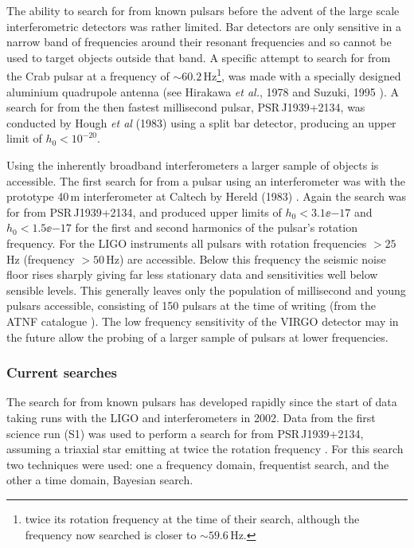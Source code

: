 The ability to search for \gws from known pulsars before the advent of the large scale
interferometric detectors was rather limited. Bar detectors are only sensitive in a narrow band of
frequencies around their resonant frequencies and so cannot be used to target objects outside
that band. A specific attempt to search for \gws from the Crab pulsar at a frequency of
$\sim 60.2$\,Hz\footnote{twice its rotation frequency at the time of their search, although the
frequency now searched is closer to $\sim 59.6$\,Hz.}, was made with a specially designed aluminium
quadrupole antenna (see Hirakawa {\it et al.}, 1978 and Suzuki, 1995 \cite{Hirakawa:1978,
Suzuki:1995}). A search for \gws from the then fastest millisecond pulsar, PSR\,J1939+2134, was
conducted by Hough {\it et al} (1983) \cite{Hough:1983} using a split bar detector, producing an
upper limit of $h_0 < 10^{-20}$. 

Using the inherently broadband interferometers a larger sample of objects is accessible. The first
search for \gws from a pulsar using an interferometer was with the prototype 40\,m interferometer at
Caltech by Hereld (1983) \cite{Hereld:1983}. Again the search was for \gws from PSR\,J1939+2134, and
produced upper limits of $h_0 < 3.1\ee{-17}$ and $h_0 < 1.5\ee{-17}$ for the first and second
harmonics of the pulsar's rotation frequency. For the LIGO instruments all pulsars with rotation
frequencies $> 25$\,Hz (\gw frequency $> 50$\,Hz) are accessible. Below this frequency the seismic
noise floor rises sharply giving far less stationary data and sensitivities well below sensible
levels. This generally leaves only the population of millisecond and young pulsars accessible,
consisting of 150 pulsars at the time of writing (from the ATNF catalogue \cite{ATNF}). The  low
frequency sensitivity of the VIRGO detector may in the future allow the probing of a larger sample
of pulsars at lower frequencies.

\subsubsection{Current searches}
The search for \gws from known pulsars has developed rapidly since the start of data taking runs
with the LIGO and \geo interferometers in 2002. Data from the first science run (S1) was used to
perform a search for \gws from PSR\,J1939+2134, assuming a triaxial star emitting at twice the
rotation frequency \cite{Abbott:2004}. For this search two techniques were used: one a frequency
domain, frequentist search, and the other a time domain, Bayesian search. 


